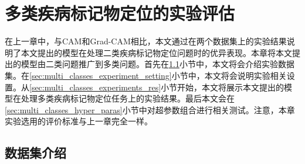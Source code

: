 \chapter{多类疾病标记物定位的实验评估}\label{sec:multi_classes}
在上一章中，与CAM和Grad-CAM相比，本文通过在两个数据集上的实验结果说明了本文提出的模型在处理二类疾病标记物定位问题时的优异表现。本章将本文提出的模型由二类问题推广到多类问题。首先在\ref{sec:mul_classes_ds_intro}小节中，本文将会介绍实验数据集。在\ref{sec:multi_classes_experiment_setting}小节中，本文将会说明实验相关设置。从\ref{sec:multi_classes_experiments_res}小节开始，本文将展示本文提出的模型在处理多类疾病标记物定位任务上的实验结果。最后本文会在\ref{sec:multi_classes_hyper_paras}小节中对超参数组合进行相关测试。注意，本章实验选用的评价标准与上一章完全一样。
\section{数据集介绍}\label{sec:mul_classes_ds_intro}
